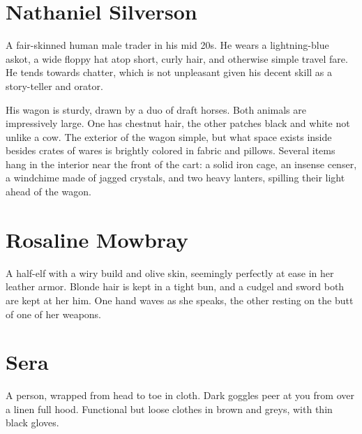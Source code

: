 \section{Nathaniel Silverson}\label{npc:nat}
\quad{}

\smallskip

\begin{aloud}
  A fair-skinned human male trader in his mid 20s.
  He wears a lightning-blue askot, a wide floppy hat atop short, curly hair, and otherwise simple travel fare.
  He tends towards chatter, which is not unpleasant given his decent skill as a story-teller and orator.
  
  His wagon is sturdy, drawn by a duo of draft horses.
  Both animals are impressively large.
  One has chestnut hair, the other patches black and white not unlike a cow.
  The exterior of the wagon simple,  but what space exists inside besides crates of wares is brightly colored in fabric and pillows.
  Several items hang in the interior near the front of the cart:
   a solid iron cage, an insense censer, a windchime made of jagged crystals, and two heavy lanters, spilling their light ahead of the wagon.
\end{aloud}



\section{Rosaline Mowbray}\label{npc:rosaline}
\begin{aloud}
	A half-elf with a wiry build and olive skin, seemingly perfectly at ease in her leather armor.
	Blonde hair is kept in a tight bun, and a cudgel and sword both are kept at her him.
	One hand waves as she speaks, the other resting on the butt of one of her weapons.
\end{aloud}

\section{Sera}\label{npc:sera}

\begin{aloud}
    A person, wrapped from head to toe in cloth.
    Dark goggles peer at you from over a linen full hood.
    Functional but loose clothes in brown and greys, with thin black gloves.
\end{aloud}

